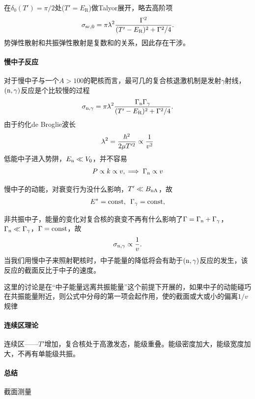 在$\delta_0(T')=\pi/2$处($T'=E_\mathrm R$)做Talyor展开，略去高阶项
\[
	\sigma_{\mathrm{sc},0}=\pi{^{_-}\!\!\!\!\lambda}^2\frac{\Gamma^2}{(T'-E_\mathrm R)^2+\Gamma^2/4}.
\]
势弹性散射和共振弹性散射是复数和的关系，因此存在干涉。
\paragraph{慢中子反应}对于慢中子与一个$A>100$的靶核而言，最可几的复合核退激机制是发射$\gamma$射线，$(\mathrm n,\gamma)$反应是个比较慢的过程
\[
	\sigma_{\mathrm n,\gamma}=\pi{^{_-}\!\!\!\!\lambda}^2\frac{\Gamma_\mathrm n\Gamma_\gamma}{(T'-E_\mathrm R)^2+\Gamma^2/4}.
\]
由于约化de Broglie波长
\[
	{^{_-}\!\!\!\!\lambda}^2=\frac{\hbar^2}{2\mu T'^2}\propto\frac1{v^2}
\]
低能中子进入势阱，$E_\mathrm n\ll V_0$，并不容易
\[
	P\propto k\propto v,\implies\Gamma_\mathrm n\propto v
\]

慢中子的动能，对衰变行为没什么影响，$T'\ll B_{\mathrm n\mathrm{A}}$，故
\[
	E^\ast=\text{const},\enspace\Gamma_\gamma=\text{const},
\]

非共振中子，能量的变化对复合核的衰变不再有什么影响了$\Gamma=\Gamma_\mathrm n+\Gamma_\gamma$，$\Gamma_\mathrm n\ll\Gamma_\gamma$，$\Gamma=\text{const}$，故
\begin{align}
	\label{slow-neutron}
	\sigma_{\mathrm n,\gamma}\propto\frac1v.
\end{align}
当我们用慢中子来照射靶核时，中子能量的降低将会有助于$(\mathrm n,\gamma)$反应的发生，该反应的截面反比于中子的速度。

这里的讨论是在“中子能量远离共振能量”这个前提下开展的，如果中子的动能碰巧在共振能量附近，则公式中分母的第一项会起作用，使的截面或大或小的偏离$1/v$规律
\paragraph{连续区理论}连续区——$T'$增加，复合核处于高激发态，能级重叠。能级密度加大，能级宽度加大，不再有单能级共振。
\paragraph{总结}截面测量

